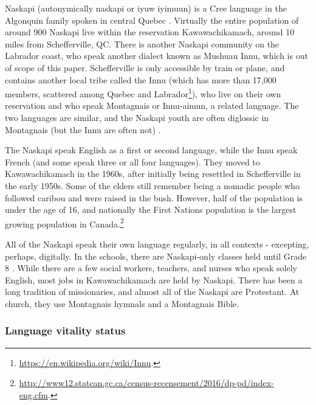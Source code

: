 Naskapi (autonymically  naskapi or  iyuw iyimuun) is a Cree language in the Algonquin family spoken in central Quebec \citep{MacKenzie-and-Jancewicz-1994}. Virtually the entire population of around 900 Naskapi live within the reservation Kawawachikamach, around 10 miles from Schefferville, QC. There is another Naskapi community on the Labrador coast, who speak another dialect known as Mushuau Innu, which is out of scope of this paper. Schefferville is only accessible by train or plane, and contains another local tribe called the Innu (which has more than 17,000 members, scattered among Quebec and Labrador\footnote{\href{https://en.wikipedia.org/wiki/Innu}{https://en.wikipedia.org/wiki/Innu}. }), who live on their own reservation and who speak Montagnais or Innu-aimun, a related language. The two languages are similar, and the Naskapi youth are often diglossic in Montagnais (but the Innu are often not) \citep{macKenzie1980towards}.

The Naskapi speak English as a first or second language, while the Innu speak French (and some speak three or all four languages). They moved to Kawawachikamach in the 1960s, after initially being resettled in Schefferville in the early 1950s. Some of the elders still remember being a nomadic people who followed caribou and were raised in the bush. However, half of the population is under the age of 16, and nationally the First Nations population is the largest growing population in Canada.\footnote{\href{http://www12.statcan.gc.ca/census-recensement/2016/dp-pd/index-eng.cfm}{http://www12.statcan.gc.ca/census-recensement/2016/dp-pd/index-eng.cfm}. }

All of the Naskapi speak their own language regularly, in all contexts - excepting, perhaps, digitally. In the schools, there are Naskapi-only classes held until Grade 8 \citep{llewellyn2017oral}. While there are a few social workers, teachers, and nurses who speak solely English, most jobs in Kawawachikamach are held by Naskapi. There has been a long tradition of missionaries, and almost all of the Naskapi are Protestant. At church, they use Montagnais hymnals and a Montagnais Bible.

\subsubsection{Language vitality status}
\label{sec:naskapi-vitality-status}

